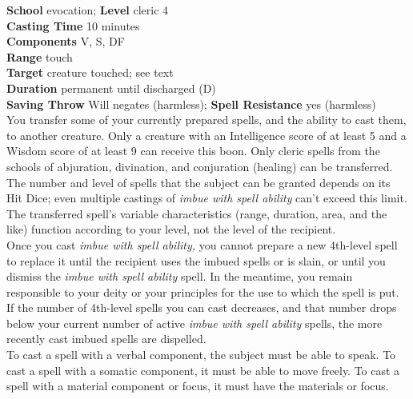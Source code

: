 \textbf{School} evocation; \textbf{Level} cleric 4\\
\textbf{Casting Time} 10 minutes\\
\textbf{Components} V, S, DF\\
\textbf{Range} touch\\
\textbf{Target} creature touched; see text\\
\textbf{Duration} permanent until discharged (D)\\
\textbf{Saving Throw }Will negates (harmless); \textbf{Spell Resistance} yes (harmless)\\
You transfer some of your currently prepared spells, and the ability to cast them, to another creature. Only a creature with an Intelligence score of at least 5 and a Wisdom score of at least 9 can receive this boon. Only cleric spells from the schools of abjuration, divination, and conjuration (healing) can be transferred. The number and level of spells that the subject can be granted depends on its Hit Dice; even multiple castings of \textit{imbue with spell ability }can't exceed this limit.\\
The transferred spell's variable characteristics (range, duration, area, and the like) function according to your level, not the level of the recipient.\\
Once you cast \textit{imbue with spell ability, }you cannot prepare a new 4th-level spell to replace it until the recipient uses the imbued spells or is slain, or until you dismiss the \textit{imbue with spell ability }spell. In the meantime, you remain responsible to your deity or your principles for the use to which the spell is put. If the number of 4th-level spells you can cast decreases, and that number drops below your current number of active \textit{imbue with spell ability }spells, the more recently cast imbued spells are dispelled.\\
To cast a spell with a verbal component, the subject must be able to speak. To cast a spell with a somatic component, it must be able to move freely. To cast a spell with a material component or focus, it must have the materials or focus.\\

